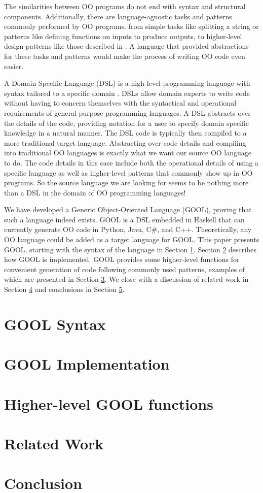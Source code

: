 \documentclass[10pt,conference]{IEEEtran}
\begin{document}
The similarities between OO programs do not end with syntax and structural 
components. Additionally, there are language-agnostic tasks and patterns 
commonly performed by OO programs. from simple tasks like splitting a string or 
patterns like defining functions on inputs to produce outputs, to higher-level 
design patterns like those described in \cite{DesignPatterns}. A language 
that provided abstractions for these tasks and patterns would make the process 
of writing OO code even easier.

A Domain Specific Language (DSL) is a high-level programming language with 
syntax tailored to a specific domain \cite{DSLs}. DSLs allow domain experts 
to write code 
without having to concern themselves with the syntactical and operational
requirements of general purpose programming languages. A DSL abstracts over the
details of the code, providing notation for a user to specify domain specific
knowledge in a natural manner. The DSL code is typically then compiled to a
more traditional target language. Abstracting over code details and compiling
into traditional OO languages is exactly what we want our source OO language to
do. The code details in this case include both the operational details of using 
a specific language as well as higher-level patterns that commonly show up in OO
programs. So the source language we are looking for seems to be nothing more
than a DSL in the domain of OO programming languages!

We have developed a Generic Object-Oriented Language (GOOL), proving that such 
a language indeed exists. GOOL is a DSL embedded in Haskell that can currently
generate OO code in Python, Java, C\#, and C++. Theoretically, any OO language 
could be added as a target language for GOOL. This paper presents GOOL, 
starting with the syntax of the language in Section \ref{syntax}. Section 
\ref{implementation} describes how GOOL is implemented. GOOL provides some 
higher-level functions for convenient generation of code following commonly 
used patterns, examples of which are presented in Section \ref{patterns}. We 
close with a discussion of related work in Section \ref{related} and 
conclusions in Section \ref{conclusions}.

\section{GOOL Syntax} \label{syntax}
\section{GOOL Implementation} \label{implementation}
\section{Higher-level GOOL functions} \label{patterns}
\section{Related Work} \label{related}
\section{Conclusion} \label{conclusions}



\end{document}

